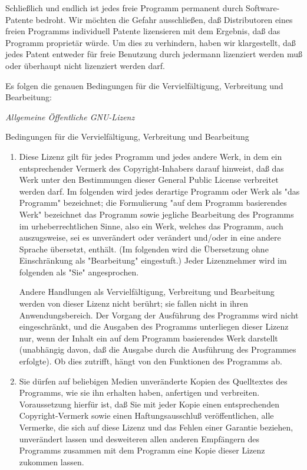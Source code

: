 {Schließlich und endlich ist jedes freie Programm permanent durch Software-Patente bedroht. Wir möchten die Gefahr ausschließen, daß Distributoren eines freien Programms individuell Patente lizensieren mit dem Ergebnis, daß das Programm proprietär würde. Um dies zu verhindern, haben wir klargestellt, daß jedes Patent entweder für freie Benutzung durch jedermann lizenziert werden muß oder überhaupt nicht lizenziert werden darf.


Es folgen die genauen Bedingungen für die Vervielfältigung, Verbreitung und Bearbeitung:



{\it Allgemeine Öffentliche GNU-Lizenz}

Bedingungen für die Vervielfältigung, Verbreitung und Bearbeitung
\begin{enumerate}
  \item Diese Lizenz gilt für jedes Programm und jedes andere Werk, in dem ein entsprechender Vermerk des Copyright-Inhabers darauf hinweist, daß das Werk unter den Bestimmungen dieser General Public License verbreitet werden darf. Im folgenden wird jedes derartige Programm oder Werk als "das Programm" bezeichnet; die Formulierung "auf dem Programm basierendes Werk" bezeichnet das Programm sowie jegliche Bearbeitung des Programms im urheberrechtlichen Sinne, also ein Werk, welches das Programm, auch auszugsweise, sei es unverändert oder verändert und/oder in eine andere Sprache übersetzt, enthält. (Im folgenden wird die Übersetzung ohne Einschränkung als "Bearbeitung" eingestuft.) Jeder Lizenznehmer wird im folgenden als "Sie" angesprochen.

Andere Handlungen als Vervielfältigung, Verbreitung und Bearbeitung werden von dieser Lizenz nicht berührt; sie fallen nicht in ihren Anwendungsbereich. Der Vorgang der Ausführung des Programms wird nicht eingeschränkt, und die Ausgaben des Programms unterliegen dieser Lizenz nur, wenn der Inhalt ein auf dem Programm basierendes Werk darstellt (unabhängig davon, daß die Ausgabe durch die Ausführung des Programmes erfolgte). Ob dies zutrifft, hängt von den Funktionen des Programms ab.

\item Sie dürfen auf beliebigen Medien unveränderte Kopien des Quelltextes des Programms, wie sie ihn erhalten haben, anfertigen und verbreiten. Voraussetzung hierfür ist, daß Sie mit jeder Kopie einen entsprechenden Copyright-Vermerk sowie einen Haftungsausschluß veröffentlichen, alle Vermerke, die sich auf diese Lizenz und das Fehlen einer Garantie beziehen, unverändert lassen und desweiteren allen anderen Empfängern des Programms zusammen mit dem Programm eine Kopie dieser Lizenz zukommen lassen.


\end{enumerate}}
